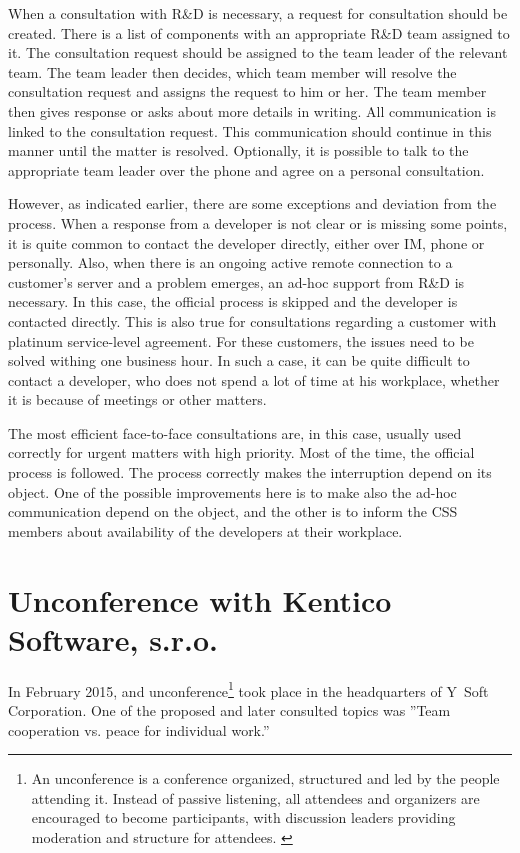 \documentclass[11pt,singleside]{myfithesis2}
\begin{document}
When a consultation with R\&D is necessary, a request for consultation should be created. There is a list of components with an appropriate R\&D team assigned to it. The consultation request should be assigned to the team leader of the relevant team. The team leader then decides, which team member will resolve the consultation request and assigns the request to him or her. The team member then gives response or asks about more details in writing. All communication is linked to the consultation request. This communication should continue in this manner until the matter is resolved. Optionally, it is possible to talk to the appropriate team leader over the phone and agree on a personal consultation.

However, as indicated earlier, there are some exceptions and deviation from the process. When a response from a developer is not clear or is missing some points, it is quite common to contact the developer directly, either over IM, phone or personally. Also, when there is an ongoing active remote connection to a customer's server and a problem emerges, an ad-hoc support from R\&D is necessary. In this case, the official process is skipped and the developer is contacted directly. This is also true for consultations regarding a customer with platinum service-level agreement. For these customers, the issues need to be solved withing one business hour. In such a case, it can be quite difficult to contact a developer, who does not spend a lot of time at his workplace, whether it is because of meetings or other matters.

The most efficient face-to-face consultations are, in this case, usually used correctly for urgent matters with high priority. Most of the time, the official process is followed. The process correctly makes the interruption depend on its object. One of the possible improvements here is to make also the ad-hoc communication depend on the object, and the other is to inform the CSS members about availability of the developers at their workplace.


	\section{Unconference with Kentico Software, s.r.o.}\label{Kentico}
In February 2015, and unconference\footnote{An unconference is a conference organized, structured and led by the people attending it. Instead of passive listening, all attendees and organizers are encouraged to become participants, with discussion leaders providing moderation and structure for attendees. \cite{unconference}} took place in the headquarters of Y~Soft Corporation. One of the proposed and later consulted topics was ''Team cooperation vs. peace for individual work.''
\end{document}
